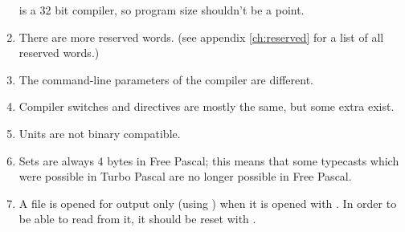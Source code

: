 \documentclass{book}
\begin{document}
\begin{enumerate}
\fpc is a 32 bit compiler, so program size shouldn't be a point.
\item There are more reserved words. (see appendix \ref{ch:reserved} for a
list of all reserved words.)
\item The command-line parameters of the compiler are different.
\item Compiler switches and directives are mostly the same, but some extra
exist.
\item Units are not binary compatible.
\item Sets are always 4 bytes in Free Pascal; this means that some typecasts
which were possible in Turbo Pascal are no longer possible in Free Pascal.
\item A file is opened for output only (using ) when it is
opened with . In order to be able to read from it, it should
be reset with .
\end{enumerate}

\end{document}
